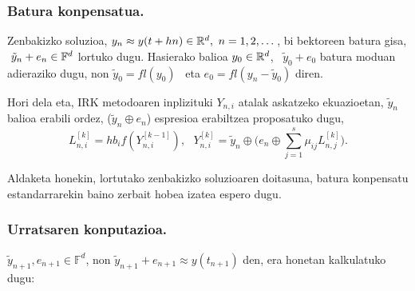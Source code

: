 \subsubsection*{Batura konpensatua.}

Zenbakizko soluzioa, $y_n \approx y(t+hn) \in \mathbb{R}^{d}, \ n=1,2,\dots$, bi bektoreen batura gisa, $ \ \tilde{y}_n+e_n \in \mathbb{F}^{d}$ lortuko dugu. Hasierako balioa $y_0 \in \mathbb{R}^{d}$, \ $\tilde{y}_0+e_0$ batura moduan adieraziko dugu, non $\tilde{y}_0=fl(y_0)$~ eta $e_0=fl(y_n-\tilde{y}_0)$ diren. 

Hori dela eta, IRK metodoaren inplizituki $Y_{n,i}$ atalak askatzeko ekuazioetan, $\tilde {y}_n$ balioa erabili ordez, ($\tilde{y}_n \oplus e_{n}$) espresioa erabiltzea proposatuko dugu, 
\begin{equation}
\label{eq:eqbk}
L_{n,i}^{[k]}=hb_if(Y_{n,i}^{[k-1]}), \ \ \ Y_{n,i}^{[k]}=\tilde{y}_n \oplus \big(e_{n} \oplus \sum\limits_{j=1}^{s} \mu_{ij} L_{n,j}^{[k]}\big).
\end{equation}

Aldaketa honekin, lortutako zenbakizko soluzioaren doitasuna, batura konpensatu estandarrarekin baino zerbait hobea izatea espero dugu. 

\subsubsection*{Urratsaren konputazioa.}

$\tilde{y}_{n+1}, e_{n+1} \in \mathbb{F}^d$, non $\tilde{y}_{n+1}+e_{n+1}\approx y(t_{n+1})$ den, era honetan kalkulatuko dugu:

